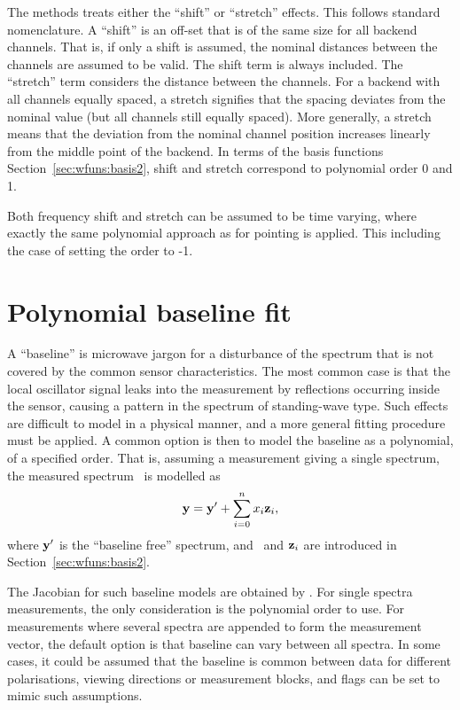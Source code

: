 The methods treats either the ``shift'' or ``stretch'' effects. This follows
standard nomenclature. A ``shift'' is an off-set that is of the same size for
all backend channels. That is, if only a shift is assumed, the nominal
distances between the channels are assumed to be valid. The shift term is
always included. The ``stretch'' term considers the distance between the
channels. For a backend with all channels equally spaced, a stretch signifies
that the spacing deviates from the nominal value (but all channels still
equally spaced). More generally, a stretch means that the deviation from the
nominal channel position increases linearly from the middle point of the
backend. In terms of the basis functions Section~\ref{sec:wfuns:basis2}, shift
and stretch correspond to polynomial order 0 and 1.

Both frequency shift and stretch can be assumed to be time varying, where
exactly the same polynomial approach as for pointing is applied. This
including the case of setting the order to -1.




\section{Polynomial baseline fit}
\label{sec:wfuns:polyfit}

A ``baseline'' is microwave jargon for a disturbance of the spectrum that is
not covered by the common sensor characteristics. The most common case is that
the local oscillator signal leaks into the measurement by reflections occurring
inside the sensor, causing a pattern in the spectrum of standing-wave type.
Such effects are difficult to model in a physical manner, and a more general
fitting procedure must be applied. A common option is then to model the
baseline as a polynomial, of a specified order. That is, assuming a measurement
giving a single spectrum, the measured spectrum \MsrVct\ is modelled as
\begin{equation}
  \label{eq:polyfit}
  \mathbf{y} = \mathbf{y}' + \sum_{i=0}^n x_{i}\mathbf{z}_i,
\end{equation}
where $\mathbf{y}'$ is the ``baseline free'' spectrum, and \ and
$\mathbf{z}_i$ are introduced in Section~\ref{sec:wfuns:basis2}.

The Jacobian for such baseline models are obtained by
. For single spectra measurements, the only
consideration is the polynomial order to use. For measurements where several
spectra are appended to form the measurement vector, the default option is that
baseline can vary between all spectra. In some cases, it could be assumed that
the baseline is common between data for different polarisations, viewing
directions or measurement blocks, and flags can be set to mimic such
assumptions.

